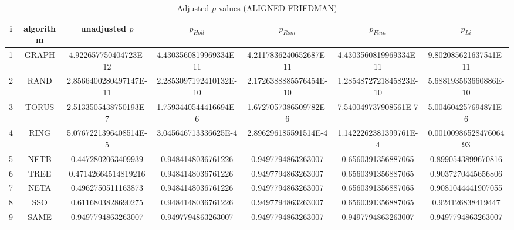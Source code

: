 \documentclass[a4paper,10pt]{article}
\begin{document}
\begin{landscape}
\begin{table}[!htp]
\centering\scriptsize
\caption{Adjusted $p$-values (ALIGNED FRIEDMAN)}
\begin{tabular}{ccccccc}
i&algorithm&unadjusted $p$&$p_{Holl}$&$p_{Rom}$&$p_{Finn}$&$p_{Li}$\\
\hline
1& GRAPH&4.922657750404723E-12&4.4303560819969334E-11&4.2117836240652687E-11&4.4303560819969334E-11&9.802085621637541E-11\\
2& RAND&2.8566400280497147E-11&2.2853097192410132E-10&2.1726388885576454E-10&1.2854872721845823E-10&5.688193563660886E-10\\
3& TORUS&2.5133505438750193E-7&1.7593440544416694E-6&1.6727057386509782E-6&7.540049737908561E-7&5.004604257694871E-6\\
4& RING&5.0767221396408514E-5&3.045646713336625E-4&2.896296185591514E-4&1.1422262381399761E-4&0.0010098652847606493\\
5& NETB&0.4472802063409939&0.9484148036761226&0.9497794863263007&0.6560391356887065&0.8990543899670816\\
6& TREE&0.47142664514819216&0.9484148036761226&0.9497794863263007&0.6560391356887065&0.9037270445656806\\
7& NETA&0.4962750511163873&0.9484148036761226&0.9497794863263007&0.6560391356887065&0.9081044441907055\\
8& SSO&0.6116803828690275&0.9484148036761226&0.9497794863263007&0.6560391356887065&0.924126838419447\\
9& SAME&0.9497794863263007&0.9497794863263007&0.9497794863263007&0.9497794863263007&0.9497794863263007\\
\hline
\end{tabular}
\end{table}


\newpage


\end{landscape}
\end{document}
